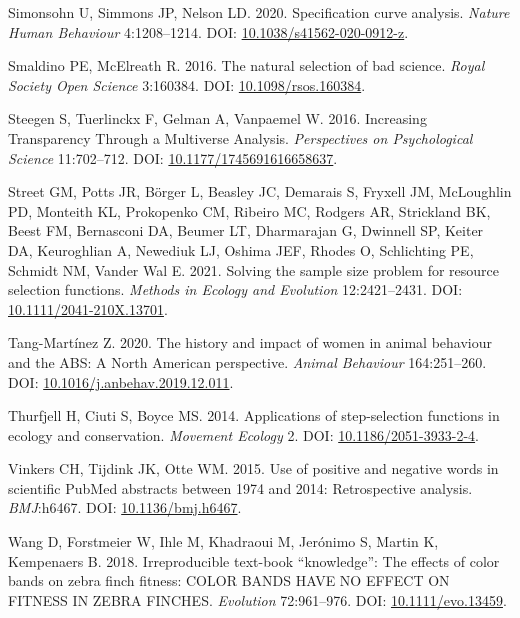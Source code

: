 \documentclass[10pt,a4paper]{article}
\newlength{\cslhangindent}
\newlength{\cslentryspacingunit} %
\newenvironment{CSLReferences}[2] %
 {%
  \setlength{\parindent}{0pt}
  \ifodd #1
  \let\oldpar\par
  \def\par{\hangindent=\cslhangindent\oldpar}
  \fi
  \setlength{\parskip}{#2\cslentryspacingunit}
 }%
 {}
\begin{document}
\begin{CSLReferences}{1}{0}
Simonsohn U, Simmons JP, Nelson LD. 2020. Specification curve analysis. \emph{Nature Human Behaviour} 4:1208--1214. DOI: \href{https://doi.org/10.1038/s41562-020-0912-z}{10.1038/s41562-020-0912-z}.

Smaldino PE, McElreath R. 2016. The natural selection of bad science. \emph{Royal Society Open Science} 3:160384. DOI: \href{https://doi.org/10.1098/rsos.160384}{10.1098/rsos.160384}.

Steegen S, Tuerlinckx F, Gelman A, Vanpaemel W. 2016. Increasing {Transparency} {Through} a {Multiverse} {Analysis}. \emph{Perspectives on Psychological Science} 11:702--712. DOI: \href{https://doi.org/10.1177/1745691616658637}{10.1177/1745691616658637}.

Street GM, Potts JR, Börger L, Beasley JC, Demarais S, Fryxell JM, McLoughlin PD, Monteith KL, Prokopenko CM, Ribeiro MC, Rodgers AR, Strickland BK, Beest FM, Bernasconi DA, Beumer LT, Dharmarajan G, Dwinnell SP, Keiter DA, Keuroghlian A, Newediuk LJ, Oshima JEF, Rhodes O, Schlichting PE, Schmidt NM, Vander Wal E. 2021. Solving the sample size problem for resource selection functions. \emph{Methods in Ecology and Evolution} 12:2421--2431. DOI: \href{https://doi.org/10.1111/2041-210X.13701}{10.1111/2041-210X.13701}.

Tang-Martínez Z. 2020. The history and impact of women in animal behaviour and the {ABS}: A {North} {American} perspective. \emph{Animal Behaviour} 164:251--260. DOI: \href{https://doi.org/10.1016/j.anbehav.2019.12.011}{10.1016/j.anbehav.2019.12.011}.

Thurfjell H, Ciuti S, Boyce MS. 2014. Applications of step-selection functions in ecology and conservation. \emph{Movement Ecology} 2. DOI: \href{https://doi.org/10.1186/2051-3933-2-4}{10.1186/2051-3933-2-4}.

Vinkers CH, Tijdink JK, Otte WM. 2015. Use of positive and negative words in scientific {PubMed} abstracts between 1974 and 2014: Retrospective analysis. \emph{BMJ}:h6467. DOI: \href{https://doi.org/10.1136/bmj.h6467}{10.1136/bmj.h6467}.

Wang D, Forstmeier W, Ihle M, Khadraoui M, Jerónimo S, Martin K, Kempenaers B. 2018. Irreproducible text-book {``knowledge''}: {The} effects of color bands on zebra finch fitness: {COLOR} {BANDS} {HAVE} {NO} {EFFECT} {ON} {FITNESS} {IN} {ZEBRA} {FINCHES}. \emph{Evolution} 72:961--976. DOI: \href{https://doi.org/10.1111/evo.13459}{10.1111/evo.13459}.


\end{CSLReferences}
\end{document}
